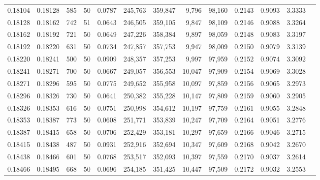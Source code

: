 \begin{tabular}{rrrrrrrrrrrrr}
0.18104 & 0.18128 &   585 &  50 &                                     0.0787 & 245,763 & 359,847 &   9,796 &  98,160 & 0.2143 & 0.9093 & 3.3333 \\
0.18128 & 0.18162 &   742 &  51 &                                     0.0643 & 246,505 & 359,105 &   9,847 &  98,109 & 0.2146 & 0.9088 & 3.3264 \\
0.18162 & 0.18192 &   721 &  50 &                                     0.0649 & 247,226 & 358,384 &   9,897 &  98,059 & 0.2148 & 0.9083 & 3.3197 \\
0.18192 & 0.18220 &   631 &  50 &                                     0.0734 & 247,857 & 357,753 &   9,947 &  98,009 & 0.2150 & 0.9079 & 3.3139 \\
0.18220 & 0.18241 &   500 &  50 &                                     0.0909 & 248,357 & 357,253 &   9,997 &  97,959 & 0.2152 & 0.9074 & 3.3092 \\
0.18241 & 0.18271 &   700 &  50 &                                     0.0667 & 249,057 & 356,553 &  10,047 &  97,909 & 0.2154 & 0.9069 & 3.3028 \\
0.18271 & 0.18296 &   595 &  50 &                                     0.0775 & 249,652 & 355,958 &  10,097 &  97,859 & 0.2156 & 0.9065 & 3.2973 \\
0.18296 & 0.18326 &   730 &  50 &                                     0.0641 & 250,382 & 355,228 &  10,147 &  97,809 & 0.2159 & 0.9060 & 3.2905 \\
0.18326 & 0.18353 &   616 &  50 &                                     0.0751 & 250,998 & 354,612 &  10,197 &  97,759 & 0.2161 & 0.9055 & 3.2848 \\
0.18353 & 0.18387 &   773 &  50 &                                     0.0608 & 251,771 & 353,839 &  10,247 &  97,709 & 0.2164 & 0.9051 & 3.2776 \\
0.18387 & 0.18415 &   658 &  50 &                                     0.0706 & 252,429 & 353,181 &  10,297 &  97,659 & 0.2166 & 0.9046 & 3.2715 \\
0.18415 & 0.18438 &   487 &  50 &                                     0.0931 & 252,916 & 352,694 &  10,347 &  97,609 & 0.2168 & 0.9042 & 3.2670 \\
0.18438 & 0.18466 &   601 &  50 &                                     0.0768 & 253,517 & 352,093 &  10,397 &  97,559 & 0.2170 & 0.9037 & 3.2614 \\
0.18466 & 0.18495 &   668 &  50 &                                     0.0696 & 254,185 & 351,425 &  10,447 &  97,509 & 0.2172 & 0.9032 & 3.2553 \\

\end{tabular}
